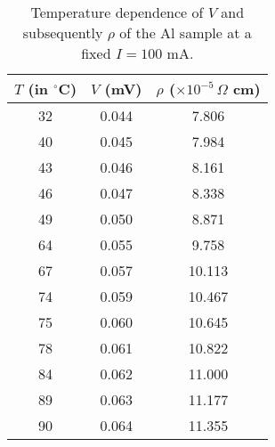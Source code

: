 \begin{table}[H]
    \centering
    \begin{tabular}{|c|c|c|}
    \hline
    $T$ (in $^\circ$C) & $V$ (mV) & $\rho$ ($\times 10^{-5}\,\Omega$ cm) \\ \hline
    32 & 0.044 & 7.806 \\ 
    40 & 0.045 & 7.984 \\ 
    43 & 0.046 & 8.161 \\ 
    46 & 0.047 & 8.338 \\ 
    49 & 0.050 & 8.871 \\ 
    64 & 0.055 & 9.758 \\ 
    67 & 0.057 & 10.113 \\ 
    74 & 0.059 & 10.467 \\ 
    75 & 0.060 & 10.645 \\ 
    78 & 0.061 & 10.822 \\ 
    84 & 0.062 & 11.000 \\ 
    89 & 0.063 & 11.177 \\ 
    90 & 0.064 & 11.355 \\ \hline
    \end{tabular}
    \caption{Temperature dependence of $V$ and subsequently $\rho$ of the Al sample at a fixed $I=100$ mA.}
\label{tab:2}
\end{table}